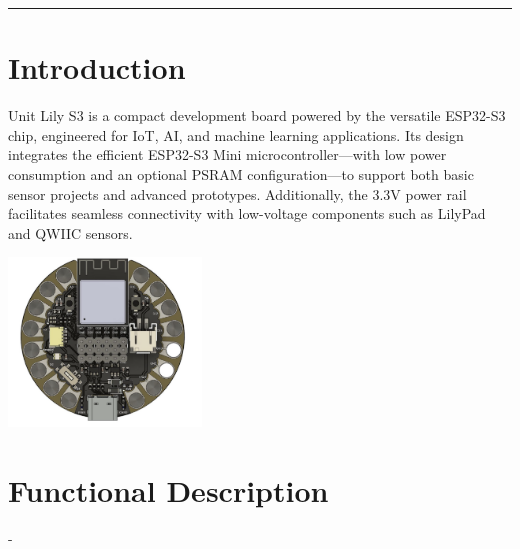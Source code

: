 \documentclass[10pt]{article}
\title{}
\author{}
\date{}
\begin{document}
\noindent
{}
\vspace{1em}
\hrule
\vspace{1.5em}

\section*{Introduction}
\vspace{0.5em}
\noindent
\begin{minipage}[t]{0.62\textwidth}
\setlength{\parskip}{0.75em}
\justifying
Unit Lily S3 is a compact development board powered by the versatile ESP32-S3 chip, engineered for IoT, AI, and machine learning applications. Its design integrates the efficient ESP32-S3 Mini microcontroller—with low power consumption and an optional PSRAM configuration—to support both basic sensor projects and advanced prototypes. Additionally, the 3.3V power rail facilitates seamless connectivity with low-voltage components such as LilyPad and QWIIC sensors.
\end{minipage}
\hfill
\begin{minipage}[t]{0.35\textwidth}
\centering
\vspace{-0.5em}
\includegraphics[height=4.5cm,keepaspectratio]{./images/product.png}
\end{minipage}

\vspace{1.0em}
\FloatBarrier %



\section*{Functional Description}
-\\ 
\end{document}
